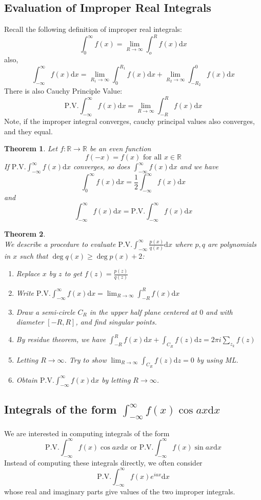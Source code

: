 \documentclass[12pt]{article}
\newcommand{\diff}{\mathrm{d}}
\newtheorem{theorem}{Theorem}[section]
\theoremstyle{definition}
\begin{document}
\subsection{Evaluation of Improper Real Integrals}
Recall the following definition of improper real integrals:
\[
\int_0^\infty f(x)=\lim_{R\to\infty}\int_o^R f(x)\diff x
\]
also, 
\[
\int_{-\infty}^\infty f(x)\diff x = \lim_{R_1\to \infty}\int_0^{R_1}f(x)\diff x + \lim_{R_2\to\infty}\int_{-R_2}^0 f(x)\diff x
\]
There is also Cauchy Principle Value:
\[
\text{P.V.}\int_{-\infty}^\infty f(x)\diff x = \lim_{R\to\infty}\int_{-R}^R f(x)\diff x
\]
Note, if the improper integral converges, cauchy principal values also converges, and they equal.
\begin{theorem}\normalfont Let $f:\mathbb{R}\to\mathbb{R}$ be an even function
\[
f(-x) = f(x)\text{ for all }x\in \mathbb{R}
\]
If $\text{P.V.} \int_{-\infty}^\infty f(x)\diff x$ converges, so does $\int_{-\infty}^\infty f(x)\diff x$ and we have
\[
\int_0^\infty f(x)\diff x = \frac{1}{2}\int_{-\infty}^\infty f(x)\diff x
\]
and
\[
\int_{-\infty}^\infty f(x)\diff x = \text{P.V.}\int_{-\infty}^\infty f(x)\diff x
\]
\end{theorem}
\begin{theorem}
\hfill\\\normalfont We describe a procedure to evaluate $\text{P.V.}\int_{-\infty}^\infty \frac{p(x)}{q(x)}\diff x$ where $p,q$ are polynomials in $x$ such that $\deg q(x)\geq \deg p(x) + 2$:
\begin{enumerate}
	\item Replace $x$ by $z$ to get $f(z)=\frac{p(z)}{q(z)}$
	\item Write $\text{P.V.}\int_{-\infty}^\infty f(x)\diff x = \lim_{R\to\infty} \int_{-R}^R f(x)\diff x$
	\item Draw a semi-circle $C_R$ in the upper half plane centered at $0$ and with diameter $[-R, R]$, and find singular points.
	\item By residue theorem, we have $\int_{-R}^R f(x)\diff x + \int_{C_R}f(z)\diff z = 2\pi i\sum_{z_k}f(z)$
	\item Letting $R\to\infty$. Try to show $\lim_{R\to\infty} \int_{C_R}f(z)\diff z =0$ by using ML.
	\item Obtain $\text{P.V.}\int_{-\infty}^\infty f(x)\diff x$ by letting $R\to\infty$.
\end{enumerate}
\end{theorem}
\subsection{Integrals of the form {$\int_{-\infty}^\infty f(x)\cos ax\diff x$ }}
We are interested in computing integrals of the form
\[
\text{P.V.}\int_{-\infty}^\infty f(x)\cos ax\diff x \text{ or }\text{P.V.}\int_{-\infty}^\infty f(x)\sin ax\diff x
\]
Instead of computing these integrals directly, we often consider 
\[
\text{P.V.}\int_{-\infty}^\infty f(x)e^{iax} \diff x
\]
whose real and imaginary parts give values of the two improper integrals.
\end{document}
